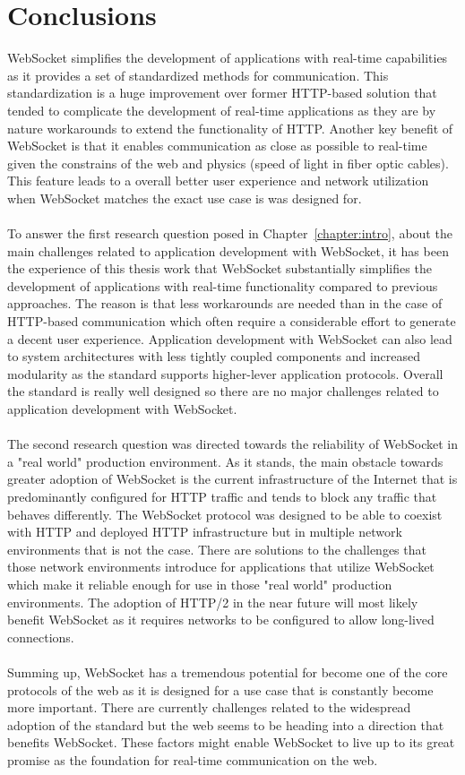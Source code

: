 \chapter{Conclusions}
\label{chapter:conslusions}

WebSocket simplifies the development of applications with real-time capabilities as it provides a set of standardized methods for communication. This standardization is a huge improvement over former HTTP-based solution that tended to complicate the development of real-time applications as they are by nature workarounds to extend the functionality of HTTP. Another key benefit of WebSocket is that it enables communication as close as possible to real-time given the constrains of the web and physics (speed of light in fiber optic cables). This feature leads to a overall better user experience and network utilization when WebSocket matches the exact use case is was designed for.
\\ \\
To answer the first research question posed in Chapter~\ref{chapter:intro}, about the main challenges related to application development with WebSocket, it has been the experience of this thesis work that WebSocket substantially simplifies the development of applications with real-time functionality compared to previous approaches. The reason is that less workarounds are needed than in the case of HTTP-based communication which often require a considerable effort to generate a decent user experience. Application development with WebSocket can also lead to system architectures with less tightly coupled components and increased modularity as the standard supports higher-lever application protocols. Overall the standard is really well designed so there are no major challenges related to application development with WebSocket.
\\ \\
The second research question was directed towards the reliability of WebSocket in a "real world" production environment. As it stands, the main obstacle towards greater adoption of WebSocket is the current infrastructure of the Internet that is predominantly configured for HTTP traffic and tends to block any traffic that behaves differently. The WebSocket protocol was designed to be able to coexist with HTTP and deployed HTTP infrastructure but in multiple network environments that is not the case. There are solutions to the challenges that those network environments introduce for applications that utilize WebSocket which make it reliable enough for use in those "real world" production environments. The adoption of HTTP/2 in the near future will most likely benefit WebSocket as it requires networks to be configured to allow long-lived connections.
\\ \\
Summing up, WebSocket has a tremendous potential for become one of the core protocols of the web as it is designed for a use case that is constantly become more important. There are currently challenges related to the widespread adoption of the standard but the web seems to be heading into a direction that benefits WebSocket. These factors might enable WebSocket to live up to its great promise as the foundation for real-time communication on the web.